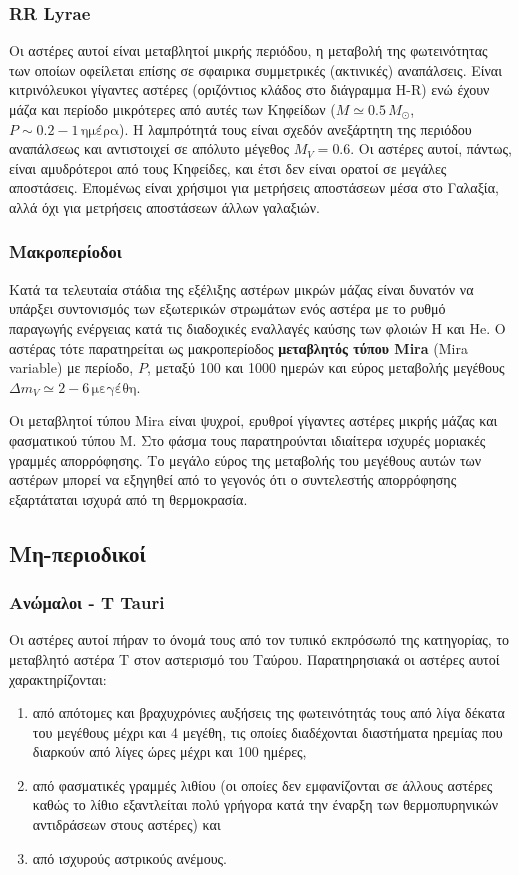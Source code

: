 \subsubsection{RR Lyrae}
Οι αστέρες αυτοί είναι μεταβλητοί μικρής περιόδου, η μεταβολή της φωτεινότητας των οποίων οφείλεται επίσης σε σφαιρικα συμμετρικές (ακτινικές) αναπάλσεις. Είναι κιτρινόλευκοι γίγαντες αστέρες (οριζόντιος κλάδος στο διάγραμμα H-R) ενώ έχουν μάζα και περίοδο μικρότερες από αυτές των Κηφείδων ($M \simeq 0.5\,M_\odot$, $P \sim 0.2 - 1\,\text{ημέρα}$). Η λαμπρότητά τους είναι σχεδόν ανεξάρτητη της περιόδου αναπάλσεως και αντιστοιχεί σε απόλυτο μέγεθος $M_V = 0.6$. Οι αστέρες αυτοί, πάντως, είναι αμυδρότεροι από τους Κηφείδες, και έτσι δεν είναι ορατοί σε μεγάλες αποστάσεις. Επομένως είναι χρήσιμοι για μετρήσεις αποστάσεων μέσα στο Γαλαξία, αλλά όχι για μετρήσεις αποστάσεων άλλων γαλαξιών.

\subsubsection{Μακροπερίοδοι}
Κατά τα τελευταία στάδια της εξέλιξης αστέρων μικρών μάζας είναι δυνατόν να υπάρξει συντονισμός των εξωτερικών στρωμάτων ενός αστέρα με το ρυθμό παραγωγής ενέργειας κατά τις διαδοχικές εναλλαγές καύσης των φλοιών H και He. Ο αστέρας τότε παρατηρείται ως μακροπερίοδος \textbf{μεταβλητός τύπου Mira} (Mira variable) με περίοδο, $P$, μεταξύ 100 και 1000 ημερών και εύρος μεταβολής μεγέθους $\Delta m_V \simeq 2 - 6\,\text{μεγέθη}$.

Οι μεταβλητοί τύπου Mira είναι ψυχροί, ερυθροί γίγαντες αστέρες μικρής μάζας και φασματικού τύπου Μ. Στο φάσμα τους παρατηρούνται ιδιαίτερα ισχυρές μοριακές γραμμές απορρόφησης. Το μεγάλο εύρος της μεταβολής του μεγέθους αυτών των αστέρων μπορεί να εξηγηθεί από το γεγονός ότι ο συντελεστής απορρόφησης εξαρτάταται ισχυρά από τη θερμοκρασία.

\subsection{Μη-περιοδικοί}
\subsubsection{Ανώμαλοι - T Tauri}
Οι αστέρες αυτοί πήραν το όνομά τους από τον τυπικό εκπρόσωπό της κατηγορίας, το μεταβλητό αστέρα Τ στον αστερισμό του Ταύρου. Παρατηρησιακά οι αστέρες αυτοί χαρακτηρίζονται:
\begin{enumerate}
    \item από απότομες και βραχυχρόνιες αυξήσεις της φωτεινότητάς τους από λίγα δέκατα του μεγέθους μέχρι και 4 μεγέθη, τις οποίες διαδέχονται διαστήματα ηρεμίας που διαρκούν από λίγες ώρες μέχρι και 100 ημέρες,
    \item από φασματικές γραμμές λιθίου (οι οποίες δεν εμφανίζονται σε άλλους αστέρες καθώς το λίθιο εξαντλείται πολύ γρήγορα κατά την έναρξη των θερμοπυρηνικών αντιδράσεων στους αστέρες) και
    \item από ισχυρούς αστρικούς ανέμους.
\end{enumerate}

